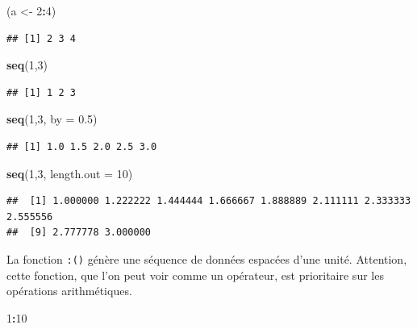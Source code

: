 \documentclass[
  11pt,
]{book}
\newenvironment{Shaded}{\begin{snugshade}}{\end{snugshade}}
\newcommand{\DataTypeTok}[1]{\textcolor[rgb]{0.13,0.29,0.53}{#1}}
\newcommand{\DecValTok}[1]{\textcolor[rgb]{0.00,0.00,0.81}{#1}}
\newcommand{\FloatTok}[1]{\textcolor[rgb]{0.00,0.00,0.81}{#1}}
\newcommand{\KeywordTok}[1]{\textcolor[rgb]{0.13,0.29,0.53}{\textbf{#1}}}
\newcommand{\NormalTok}[1]{#1}
\newcommand{\OperatorTok}[1]{\textcolor[rgb]{0.81,0.36,0.00}{\textbf{#1}}}
\newcommand{\StringTok}[1]{\textcolor[rgb]{0.31,0.60,0.02}{#1}}
\numberwithin{equation}{section}
\numberwithin{countremarque}{section}
\begin{document}
\begin{Shaded}
\begin{Highlighting}[]
\NormalTok{(a \textless{}{-}}\StringTok{ }\DecValTok{2}\OperatorTok{:}\DecValTok{4}\NormalTok{)}
\end{Highlighting}
\end{Shaded}

\begin{lstlisting}
## [1] 2 3 4
\end{lstlisting}

\begin{Shaded}
\begin{Highlighting}[]
\KeywordTok{seq}\NormalTok{(}\DecValTok{1}\NormalTok{,}\DecValTok{3}\NormalTok{)}
\end{Highlighting}
\end{Shaded}

\begin{lstlisting}
## [1] 1 2 3
\end{lstlisting}

\begin{Shaded}
\begin{Highlighting}[]
\KeywordTok{seq}\NormalTok{(}\DecValTok{1}\NormalTok{,}\DecValTok{3}\NormalTok{, }\DataTypeTok{by =} \FloatTok{0.5}\NormalTok{)}
\end{Highlighting}
\end{Shaded}

\begin{lstlisting}
## [1] 1.0 1.5 2.0 2.5 3.0
\end{lstlisting}

\begin{Shaded}
\begin{Highlighting}[]
\KeywordTok{seq}\NormalTok{(}\DecValTok{1}\NormalTok{,}\DecValTok{3}\NormalTok{, }\DataTypeTok{length.out =} \DecValTok{10}\NormalTok{)}
\end{Highlighting}
\end{Shaded}

\begin{lstlisting}
##  [1] 1.000000 1.222222 1.444444 1.666667 1.888889 2.111111 2.333333 2.555556
##  [9] 2.777778 3.000000
\end{lstlisting}

La fonction \texttt{:()} génère une séquence de données espacées d'une unité. Attention, cette fonction, que l'on peut voir comme un opérateur, est prioritaire sur les opérations arithmétiques.

\begin{Shaded}
\begin{Highlighting}[]
\DecValTok{1}\OperatorTok{:}\DecValTok{10}
\end{Highlighting}
\end{Shaded}
\end{document}
